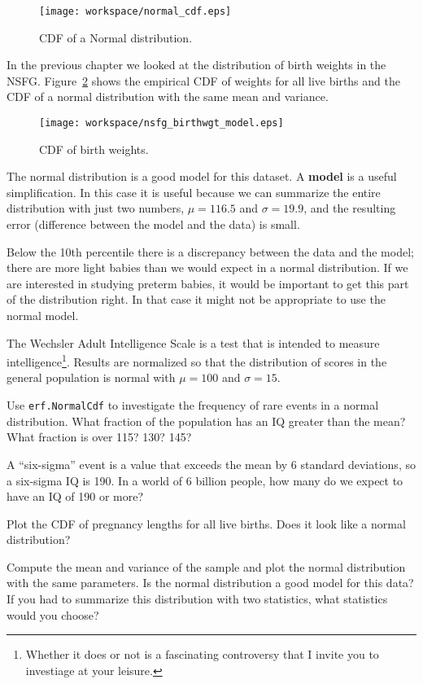 \documentclass[10pt]{book}
\begin{document}
\begin{figure}
\centerline{\texttt{[image: workspace/normal\_cdf.eps]}}
\caption{CDF of a Normal distribution.}
\label{normal_cdf}
\end{figure}

In the previous chapter we looked at the distribution of birth
weights in the NSFG.  Figure~\ref{nsfg_birthwgt_model} shows the
empirical CDF of weights for all live births and the CDF of
a normal distribution with the same mean and variance.

\begin{figure}
\centerline{\texttt{[image: workspace/nsfg\_birthwgt\_model.eps]}}
\caption{CDF of birth weights.}
\label{nsfg_birthwgt_model}
\end{figure}

The normal distribution is a good model for this dataset.  A {\bf
  model} is a useful simplification.  In this case it is useful
because we can summarize the entire distribution with just two
numbers, $\mu=116.5$ and $\sigma=19.9$, and the resulting error
(difference between the model and the data) is small.

Below the 10th percentile there is a discrepancy between the data
and the model; there are more light babies than we would expect in
a normal distribution.  If we are interested in studying preterm
babies, it would be important to get this part of the distribution
right.  In that case it might not be appropriate to use the normal
model.

\begin{ex}
The Wechsler Adult Intelligence Scale is a test that is intended
to measure intelligence\footnote{Whether it does or not is a
fascinating controversy that I invite you to investiage at your
leisure.}.  Results are normalized so that the distribution of scores
in the general population is normal with $\mu=100$ and $\sigma=15$.

Use {\tt erf.NormalCdf} to investigate the frequency of rare events
in a normal distribution.
What fraction of the population has an IQ greater than the mean?
What fraction is over 115?  130?  145?

A ``six-sigma'' event is a value that exceeds the mean by 6 standard
deviations, so a six-sigma IQ is 190.  In a world of 6 billion people,
how many do we expect to have an IQ of 190 or more?
\end{ex}


\begin{ex}
Plot the CDF of pregnancy lengths for all live births.  Does it
look like a normal distribution?

Compute the mean and variance of the sample and plot the normal
distribution with the same parameters.  Is the normal distribution a
good model for this data?  If you had to summarize this distribution
with two statistics, what statistics would you choose?
\end{ex}
\end{document}
